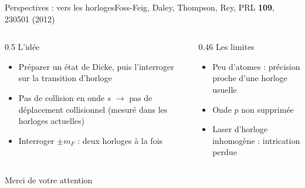 \documentclass[aspectratio=169, 11pt]{beamer}
\begin{document}
\begin{frame}{Perspectives : vers les horloges}{Foss-Feig, Daley, Thompson, Rey, PRL \textbf{109}, 230501 (2012)}
  \begin{columns}[t]
    \begin{column}{0.5\textwidth}
      {\fontforte\color{vert} L'idée}\par\vspace{0.1cm}
      \begin{itemize}
        \item<1-> Préparer un état de Dicke, puis l'interroger sur la transition d'horloge
        \item<2-> Pas de collision en onde $s$ $\to$ \alert{pas de déplacement collisionnel}
          (mesuré dans les horloges actuelles)
        \item<3-> Interroger $\pm m_F$ : deux horloges à la fois
      \end{itemize}
    \end{column}
    \begin{column}{0.46\textwidth}
      {\fontforte\color{violet} Les limites}\par\vspace{0.1cm}
      \begin{itemize}
        \item<4-> Peu d'atomes : précision proche d'une horloge usuelle
        \item<4-> Onde $p$ non supprimée
        \item<4-> Laser d'horloge inhomogène : intrication perdue
      \end{itemize}
    \end{column}
  \end{columns}
\end{frame}

\begin{frame}[standout]
  Merci de votre attention\\[0.4cm]
  \traitlaser[3cm]
\end{frame}

\appendix
\end{document}
